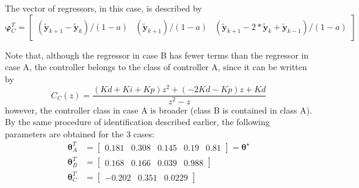 \begin{exmp}
\begin{description}
         The vector of regressors, in this case, is described by
         \begin{equation}
            \bm{\varphi}^T_C = \begin{bmatrix} 
               (\tilde{\bm{y}}_{k+1}-\tilde{\bm{y}}_k)/(1-a) &
               (\tilde{\bm{y}}_{k+1})/(1-a) &
               (\tilde{\bm{y}}_{k+1}-2*\tilde{\bm{y}}_k+\tilde{\bm{y}}_{k-1})/(1-a)
            \end{bmatrix} 
            \label{eq:}
         \end{equation}
   \end{description}
   Note that, although the regressor in case B has fewer terms than the regressor in case A, the controller belongs to the class of controller A, since it can be written by
   \begin{equation*}
      C_C(z) = \frac{(Kd + Ki + Kp)z^2 + (- 2Kd - Kp)z + Kd}{z^2 - z}
   \end{equation*}
   however, the controller class in case A is broader (class B is contained in class A).
   By the same procedure of identification described earlier, the following parameters are obtained for the 3 cases:
   \begin{align}
      \label{eq:ex31_par3casos}
      \bm{\theta}_A^T &= \begin{bmatrix}   0.181 & 0.308 &  0.145 &  0.19 & 0.81 \end{bmatrix} = \bm{\theta}^\star \nonumber \\
      \bm{\theta}_B^T &= \begin{bmatrix}   0.168 & 0.166 & 0.039 & 0.988 \end{bmatrix} \nonumber \\
      \bm{\theta}_C^T &= \begin{bmatrix}   -0.202 & 0.351 & 0.0229 \end{bmatrix} \nonumber 
   \end{align}
   

\end{exmp}
